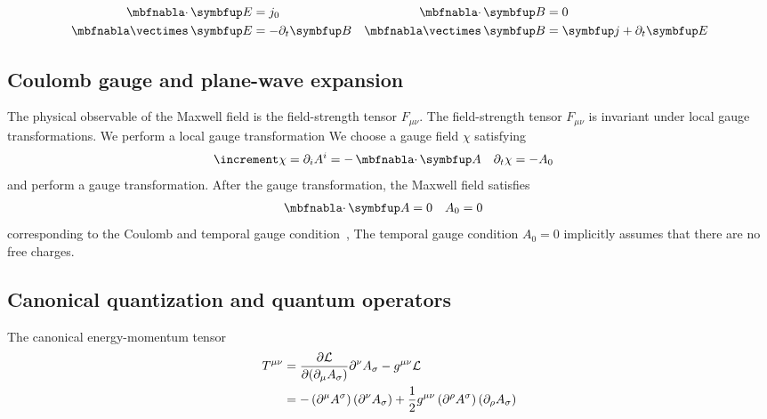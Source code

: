 \begin{align}
	\div\vb{E}
	&=
	j_0
	&
	\div\vb{B}
	&=
	0
	\\
	\curl\vb{E}
	&=
	-\partial_t\vb{B}
	&
	\curl\vb{B}
	&=
	\vb{j}
	+
	\partial_t\vb{E}
\end{align}

\subsection{Coulomb gauge and plane-wave expansion}

The physical observable of the Maxwell field is the field-strength tensor $F_{\mu\nu}$.
The field-strength tensor $F_{\mu\nu}$ is invariant under local gauge transformations.
We perform a local gauge transformation 
We choose a gauge field $\chi$ satisfying
\begin{align}
	\laplace\chi
	&=
	\partial_i A^i
	=
	-
	\div\vb{A}
	&
	\partial_t
	\chi
	&=
	-
	A_0
\end{align}
and perform a gauge transformation.
After the gauge transformation, the Maxwell field satisfies
\begin{align}
	\div\vb{A}
	&=
	0
	&
	A_0
	&=0
\end{align}
corresponding to the Coulomb and temporal gauge condition~\cite[p.~144]{Greiner2013},
The temporal gauge condition $A_0=0$ implicitly assumes that there are no free charges.




\subsection{Canonical quantization and quantum operators}

The canonical energy-momentum tensor~\cite[p.~174]{Greiner2013}
\begin{equation}
	\begin{split}
		T^{\mu\nu}
		&=
		\pdv{\mathcal{L}}{(\partial_\mu A_\sigma)}
		\partial^\nu A_\sigma
		-
		g^{\mu\nu}\mathcal{L}
		\\
		&=
		-
		\left(
			\partial^\mu
			A^\sigma
		\right)
		\left(
			\partial^\nu
			A_\sigma
		\right)
		+
		\frac{1}{2}
		g^{\mu\nu}
		\left(
			\partial^\rho
			A^\sigma
		\right)
		\left(
			\partial_\rho
			A_\sigma
		\right)
	\end{split}
\end{equation}

